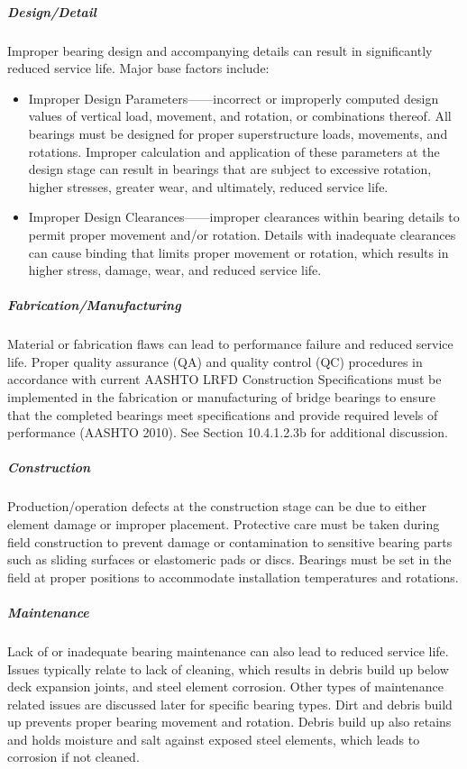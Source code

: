 \subparagraph*{Design/Detail}
Improper bearing design and accompanying details can result in significantly reduced service life. Major base
factors include:
\begin{itemize}
    \item Improper Design Parameters——incorrect or improperly computed design values of vertical load, movement,
    and rotation, or combinations thereof. All bearings must be designed for proper superstructure loads, movements, and
    rotations. Improper calculation and application of these parameters at the design stage can result in bearings that are
    subject to excessive rotation, higher stresses, greater wear, and ultimately, reduced service life.
    \item Improper Design Clearances——improper clearances within bearing details to permit proper movement and/or
    rotation. Details with inadequate clearances can cause binding that limits proper movement or rotation, which results
    in higher stress, damage, wear, and reduced service life.
\end{itemize}

\subparagraph{Fabrication/Manufacturing}
Material or fabrication flaws can lead to performance failure and reduced service life. Proper quality assurance
(QA) and quality control (QC) procedures in accordance with current AASHTO LRFD Construction Specifications
must be implemented in the fabrication or manufacturing of bridge bearings to ensure that the completed bearings
meet specifications and provide required levels of performance (AASHTO 2010). See Section 10.4.1.2.3b for
additional discussion.

\subparagraph{Construction}
Production/operation defects at the construction stage can be due to either element damage or improper
placement. Protective care must be taken during field construction to prevent damage or contamination to sensitive
bearing parts such as sliding surfaces or elastomeric pads or discs. Bearings must be set in the field at proper
positions to accommodate installation temperatures and rotations.

\subparagraph{Maintenance}
Lack of or inadequate bearing maintenance can also lead to reduced service life. Issues typically relate to lack of
cleaning, which results in debris build up below deck expansion joints, and steel element corrosion. Other types of
maintenance related issues are discussed later for specific bearing types. Dirt and debris build up prevents proper
bearing movement and rotation. Debris build up also retains and holds moisture and salt against exposed steel
elements, which leads to corrosion if not cleaned.

